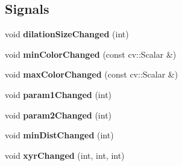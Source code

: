 \subsection*{Signals}
\begin{DoxyCompactItemize}
\item 
\mbox{\label{class_color_detector_controller_a0750b4604ba5891c67ff470a37477278}} 
void {\bfseries dilation\+Size\+Changed} (int)
\item 
\mbox{\label{class_color_detector_controller_af24880bbd700dc3ea4dc876be98c6a06}} 
void {\bfseries min\+Color\+Changed} (const cv\+::\+Scalar \&)
\item 
\mbox{\label{class_color_detector_controller_aac5cf8b463491642ae8b85a89b5675d5}} 
void {\bfseries max\+Color\+Changed} (const cv\+::\+Scalar \&)
\item 
\mbox{\label{class_color_detector_controller_a9774e7dbb2854b624fa275956aa4b571}} 
void {\bfseries param1\+Changed} (int)
\item 
\mbox{\label{class_color_detector_controller_a2b8cec0c284d6f24420783f8e11ead88}} 
void {\bfseries param2\+Changed} (int)
\item 
\mbox{\label{class_color_detector_controller_ae8f375a29491a3151cb67c6941a3bf6e}} 
void {\bfseries min\+Dist\+Changed} (int)
\item 
\mbox{\label{class_color_detector_controller_a5568479bdc21021dfaad7f61ce82db5d}} 
void {\bfseries xyr\+Changed} (int, int, int)
\end{DoxyCompactItemize}
